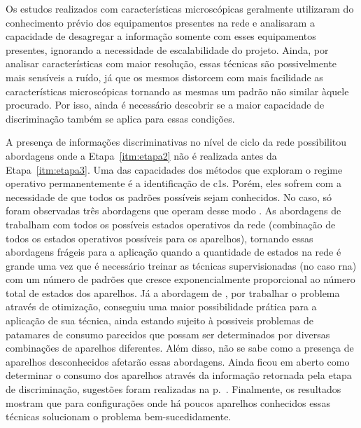 Os estudos realizados com características microscópicas geralmente
utilizaram do conhecimento prévio dos equipamentos presentes na rede e
analisaram a capacidade de desagregar a informação somente com esses
equipamentos presentes, ignorando a necessidade de escalabilidade do
projeto. Ainda, por analisar características com maior resolução,
essas técnicas são possivelmente mais sensíveis a ruído, já que os
mesmos distorcem com mais facilidade as características microscópicas
tornando as mesmas um padrão não similar àquele procurado. Por isso,
ainda é necessário descobrir se a maior capacidade de discriminação
também se aplica para essas condições.

A presença de informações discriminativas no nível de ciclo da rede
possibilitou abordagens onde a Etapa~\ref{itm:etapa2} não é realizada
antes da Etapa~\ref{itm:etapa3}. Uma das capacidades dos métodos que
exploram o regime operativo permanentemente é a identificação de
\glspl{c1}. Porém, eles sofrem com a necessidade de que todos os
padrões possíveis sejam conhecidos. No caso, só foram observadas três
abordagens que operam desse modo \cite{nilm_srinivasan_nn_2006_27,
nilm_itajuba_rodrigues,nilm_suzuki_2011_35}. As abordagens de
\cite{nilm_srinivasan_nn_2006_27,nilm_itajuba_rodrigues} trabalham com
todos os possíveis estados operativos da rede (combinação de todos os
estados operativos possíveis para os aparelhos), tornando essas
abordagens frágeis para a aplicação quando a quantidade de estados na
rede é grande uma vez que é necessário treinar as técnicas
supervisionadas (no caso \gls{rna}) com um número de padrões que
cresce exponencialmente proporcional ao número total de estados dos
aparelhos. Já a abordagem de \cite{nilm_suzuki_2011_35}, por trabalhar
o problema através de otimização, conseguiu uma maior possibilidade
prática para a aplicação de sua técnica, ainda estando sujeito à
possiveis problemas de patamares de consumo parecidos que possam ser
determinados por diversas combinações de aparelhos diferentes. Além
disso, não se sabe como a presença de aparelhos desconhecidos afetarão
essas abordagens. Ainda ficou em aberto como determinar o consumo dos
aparelhos através da informação retornada pela etapa de discriminação,
sugestões foram realizadas na p.~\pageref{text:transf_info_discr_energia}.
Finalmente, os resultados mostram que para configurações onde há
poucos aparelhos conhecidos essas técnicas solucionam o problema
bem-sucedidamente.

